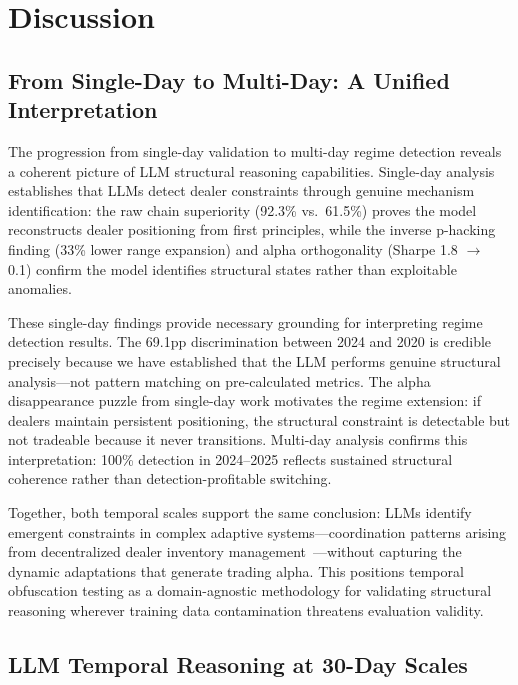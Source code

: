 \section{Discussion}
\label{sec:discussion}

\subsection{From Single-Day to Multi-Day: A Unified Interpretation}

The progression from single-day validation to multi-day regime detection reveals a coherent picture of LLM structural reasoning capabilities. Single-day analysis establishes that LLMs detect dealer constraints through genuine mechanism identification: the raw chain superiority (92.3\% vs.\ 61.5\%) proves the model reconstructs dealer positioning from first principles, while the inverse p-hacking finding (33\% lower range expansion) and alpha orthogonality (Sharpe 1.8 $\rightarrow$ 0.1) confirm the model identifies structural states rather than exploitable anomalies.

These single-day findings provide necessary grounding for interpreting regime detection results. The 69.1pp discrimination between 2024 and 2020 is credible precisely because we have established that the LLM performs genuine structural analysis---not pattern matching on pre-calculated metrics. The alpha disappearance puzzle from single-day work motivates the regime extension: if dealers maintain persistent positioning, the structural constraint is detectable but not tradeable because it never transitions. Multi-day analysis confirms this interpretation: 100\% detection in 2024--2025 reflects sustained structural coherence rather than detection-profitable switching.

Together, both temporal scales support the same conclusion: LLMs identify emergent constraints in complex adaptive systems---coordination patterns arising from decentralized dealer inventory management~\cite{grossman1988liquidity}---without capturing the dynamic adaptations that generate trading alpha. This positions temporal obfuscation testing as a domain-agnostic methodology for validating structural reasoning wherever training data contamination threatens evaluation validity.

\subsection{LLM Temporal Reasoning at 30-Day Scales}

